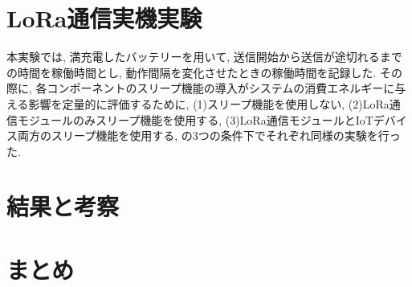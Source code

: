 \documentclass[lualatex, twocolumn]{ltjsarticle}
\begin{document}
\section{LoRa通信実機実験}
本実験では, 満充電したバッテリーを用いて, 送信開始から送信が途切れるまでの時間を稼働時間とし,
動作間隔を変化させたときの稼働時間を記録した. 
その際に, 各コンポーネントのスリープ機能の導入がシステムの消費エネルギーに与える影響を定量的に評価するために,
(1)スリープ機能を使用しない, (2)LoRa通信モジュールのみスリープ機能を使用する, (3)LoRa通信モジュールとIoTデバイス両方のスリープ機能を使用する, の3つの条件下でそれぞれ同様の実験を行った.

\section{結果と考察}

\section{まとめ}
\end{document}
